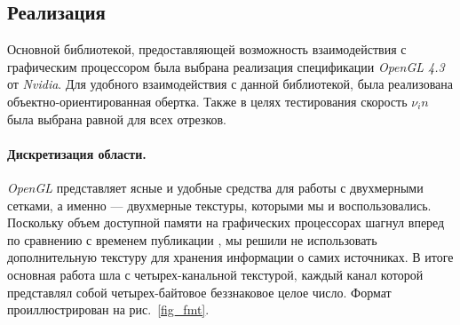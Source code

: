 \documentclass[12pt]{article}
\begin{document}
\subsection{Реализация}
Основной библиотекой, предоставляющей возможность взаимодействия с графическим
процессором была выбрана реализация спецификации \emph{OpenGL 4.3} от 
\emph{Nvidia}. Для удобного взаимодействия с данной библиотекой, была 
реализована объектно-ориентированная обертка. Также в целях тестирования
скорость $\nu_in$ была выбрана равной для всех отрезков.

\paragraph{Дискретизация области.} \emph{OpenGL} представляет ясные и 
удобные средства для работы с двухмерными сетками, а именно --- двухмерные
текстуры, которыми мы и воспользовались. Поскольку объем доступной памяти
на графических процессорах шагнул вперед по сравнению с временем публикации
\cite{gvd}, мы решили не использовать дополнительную текстуру для хранения
информации о самих источниках. В итоге основная работа шла с четырех-канальной 
текстурой, каждый канал которой представлял собой четырех-байтовое 
беззнаковое целое число. Формат проиллюстрирован на рис.~\ref{fig_fmt}.
\end{document}
